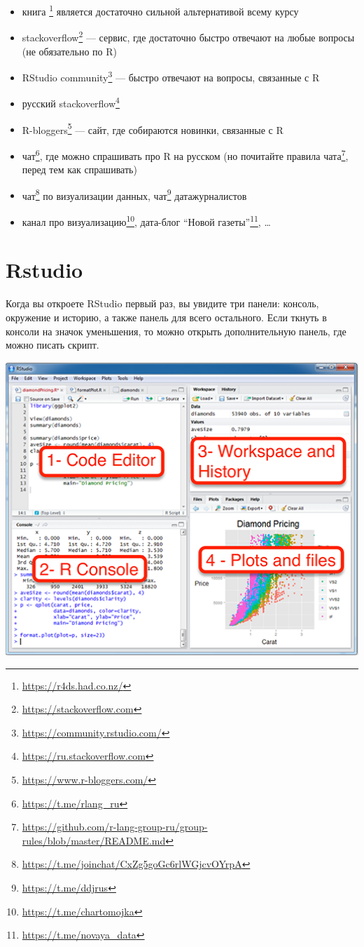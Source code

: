 \documentclass[
]{book}
\providecommand{\tightlist}{%
  \setlength{\itemsep}{0pt}\setlength{\parskip}{0pt}}
\renewcommand{\href}[2]{#2\footnote{\url{#1}}}
\begin{document}
\begin{itemize}
\tightlist
\item
  \href{https://r4ds.had.co.nz/}{книга \citep{wickham16}} является достаточно сильной альтернативой всему курсу
\item
  \href{https://stackoverflow.com}{stackoverflow} --- сервис, где достаточно быстро отвечают на любые вопросы (не обязательно по R)
\item
  \href{https://community.rstudio.com/}{RStudio community} --- быстро отвечают на вопросы, связанные с R
\item
  \href{https://ru.stackoverflow.com}{русский stackoverflow}
\item
  \href{https://www.r-bloggers.com/}{R-bloggers} --- сайт, где собираются новинки, связанные с R
\item
  \href{https://t.me/rlang_ru}{чат}, где можно спрашивать про R на русском (но почитайте \href{https://github.com/r-lang-group-ru/group-rules/blob/master/README.md}{правила чата}, перед тем как спрашивать)
\item
  \href{https://t.me/joinchat/CxZg5goGc6rlWGjcvOYrpA}{чат} по визуализации данных, \href{https://t.me/ddjrus}{чат} датажурналистов
\item
  \href{https://t.me/chartomojka}{канал про визуализацию}, \href{https://t.me/novaya_data}{дата-блог ``Новой газеты''}, \ldots{}
\end{itemize}

\hypertarget{rstudio}{%
\section{Rstudio}\label{rstudio}}

Когда вы откроете RStudio первый раз, вы увидите три панели: консоль, окружение и историю, а также панель для всего остального. Если ткнуть в консоли на значок уменьшения, то можно открыть дополнительную панель, где можно писать скрипт.

\includegraphics[width=6.94in]{images/01_01_rstudio}
\end{document}
